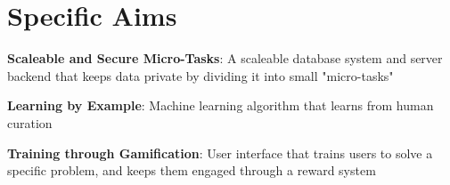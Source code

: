 \section{Specific Aims}
\begin{compactenum}
\item \textbf{Scaleable and Secure Micro-Tasks}: A scaleable database system and server backend that keeps data private by dividing it into small "micro-tasks"
\item \textbf{Learning by Example}: Machine learning algorithm that learns from human curation
\item \textbf{Training through Gamification}: User interface that trains users to solve a specific problem, and keeps them engaged through a reward system 
\end{compactenum}

